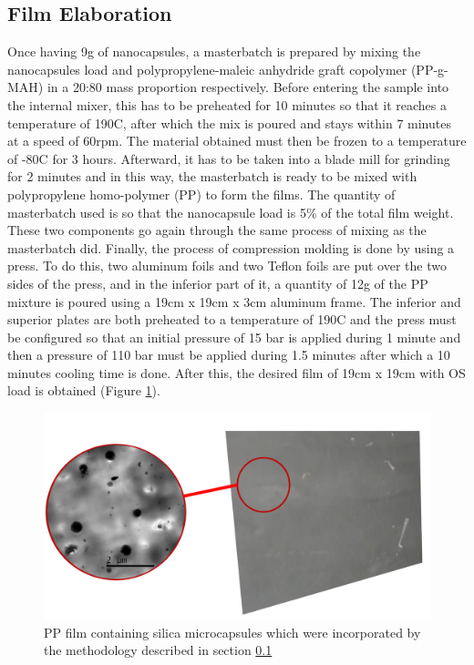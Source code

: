 \begin{refsection}
\subsection{Film Elaboration} \label{sec:film_elaboration}
Once having 9g of nanocapsules, a masterbatch is prepared by mixing the nanocapsules load and polypropylene-maleic anhydride graft copolymer (PP-g-MAH) in a  20:80 mass proportion respectively. Before entering the sample into the internal mixer, this has to be preheated for 10 minutes so that it reaches a temperature of 190\degree C, after which the mix is poured and stays within 7 minutes at a speed of 60rpm. The material obtained must then be frozen to a temperature of -80\degree C for 3 hours. Afterward, it has to be taken into a blade mill for grinding for 2 minutes and in this way, the masterbatch is ready to be mixed with polypropylene homo-polymer (PP) to form the films. The quantity of masterbatch used is so that the nanocapsule load is 5\% of the total film weight. These two components go again through the same process of mixing as the masterbatch did. Finally, the process of compression molding is done by using a press. To do this, two aluminum foils and two Teflon foils are put over the two sides of the press, and in the inferior part of it, a quantity of 12g of the PP mixture is poured using a 19cm x 19cm x 3cm aluminum frame. The inferior and superior plates are both preheated to a temperature of 190\degree C and the press must be configured so that an initial pressure of 15 bar is applied during 1 minute and then a pressure of 110 bar must be applied during 1.5 minutes after which a 10 minutes cooling time is done. After this, the desired film of 19cm x 19cm with OS load is obtained (Figure \ref{fig:film}).

\begin{figure}[ht]
    \centering
    \includegraphics[width=0.6\linewidth]{Documento_Latex/Tesis_1/Imagenes/pelicula.png}
    \caption{PP film containing silica microcapsules which were incorporated by the methodology described in section \ref{sec:film_elaboration} \cite{ArellanoAyala2019EfectosAntioxidantes}}
    \label{fig:film}
\end{figure}


\end{refsection}
